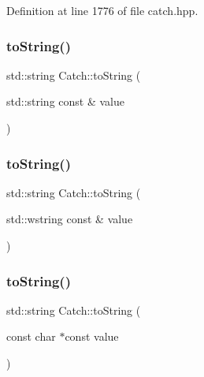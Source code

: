 Definition at line 1776 of file catch.\+hpp.

\hypertarget{namespace_catch_ad6e969257437cf007b8b5017b22e570c}{}\label{namespace_catch_ad6e969257437cf007b8b5017b22e570c} 
\subsubsection{\texorpdfstring{to\+String()}{toString()}\hspace{0.1cm}{\footnotesize\ttfamily [2/17]}}
{\footnotesize\ttfamily std\+::string Catch\+::to\+String (\begin{DoxyParamCaption}\item[{std\+::string const \&}]{value }\end{DoxyParamCaption})}

\hypertarget{namespace_catch_af9fc40701e3a7d0790866e7cf8c0279f}{}\label{namespace_catch_af9fc40701e3a7d0790866e7cf8c0279f} 
\subsubsection{\texorpdfstring{to\+String()}{toString()}\hspace{0.1cm}{\footnotesize\ttfamily [3/17]}}
{\footnotesize\ttfamily std\+::string Catch\+::to\+String (\begin{DoxyParamCaption}\item[{std\+::wstring const \&}]{value }\end{DoxyParamCaption})}

\hypertarget{namespace_catch_ace2e2fe33b196bc8278f605dcb72e38d}{}\label{namespace_catch_ace2e2fe33b196bc8278f605dcb72e38d} 
\subsubsection{\texorpdfstring{to\+String()}{toString()}\hspace{0.1cm}{\footnotesize\ttfamily [4/17]}}
{\footnotesize\ttfamily std\+::string Catch\+::to\+String (\begin{DoxyParamCaption}\item[{const char $\ast$const}]{value }\end{DoxyParamCaption})}

\hypertarget{namespace_catch_ae6c2bc95517444d8df8199bd3f61609b}{}\label{namespace_catch_ae6c2bc95517444d8df8199bd3f61609b} 
